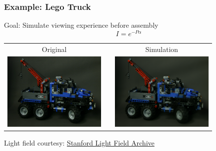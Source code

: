 \documentclass[12pt, compress]{beamer}
\begin{document}

\begin{frame}[fragile]
	\frametitle{Example: Lego Truck}
	
	Goal: Simulate viewing experience before assembly
	\begin{equation*}
		I = e^{- P \alpha}
	\end{equation*}
	
	\begin{center}
		\begin{tabular}{c p{0cm} c}
			Original & & Simulation \\
			\includegraphics[width = 5cm]{images/layers_and_projections/legotruck/original/08_08}
			& & \includegraphics[width = 5cm]{images/layers_and_projections/legotruck/Reconstruction_of_view_(3,3)}
		\end{tabular}
	\end{center}
	{\scriptsize Light field courtesy: \href{http://lightfield.stanford.edu/lfs.html}{Stanford Light Field Archive}}

\end{frame}
\end{document}

